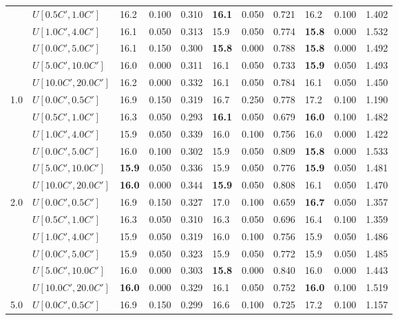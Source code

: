 \begin{table}[h]
{\begin{tabular}{|l|l||l|l|l||l|l|l||l|l|l|}
       & $U[0.5C',1.0C']$ & 16.2 & 0.100 & 0.310 & \textbf{16.1} & 0.050 & 0.721 & 16.2 & 0.100 & 1.402 \\
       & $U[1.0C',4.0C']$ & 16.1 & 0.050 & 0.313 & 15.9 & 0.050 & 0.774 & \textbf{15.8} & 0.000 & 1.532 \\
       & $U[0.0C',5.0C']$ & 16.1 & 0.150 & 0.300 & \textbf{15.8} & 0.000 & 0.788 & \textbf{15.8} & 0.000 & 1.492 \\
       & $U[5.0C',10.0C']$ & 16.0 & 0.000 & 0.311 & 16.1 & 0.050 & 0.733 & \textbf{15.9} & 0.050 & 1.493 \\
       & $U[10.0C',20.0C']$ & 16.2 & 0.000 & 0.332 & 16.1 & 0.050 & 0.784 & 16.1 & 0.050 & 1.450 \\
      \hline\hline
      \multirow{6}{*}{1.0} & $U[0.0C',0.5C']$ & 16.9 & 0.150 & 0.319 & 16.7 & 0.250 & 0.778 & 17.2 & 0.100 & 1.190 \\
       & $U[0.5C',1.0C']$ & 16.3 & 0.050 & 0.293 & \textbf{16.1} & 0.050 & 0.679 & \textbf{16.0} & 0.100 & 1.482 \\
       & $U[1.0C',4.0C']$ & 15.9 & 0.050 & 0.339 & 16.0 & 0.100 & 0.756 & 16.0 & 0.000 & 1.422 \\
       & $U[0.0C',5.0C']$ & 16.0 & 0.100 & 0.302 & 15.9 & 0.050 & 0.809 & \textbf{15.8} & 0.000 & 1.533 \\
       & $U[5.0C',10.0C']$ & \textbf{15.9} & 0.050 & 0.336 & 15.9 & 0.050 & 0.776 & \textbf{15.9} & 0.050 & 1.481 \\
       & $U[10.0C',20.0C']$ & \textbf{16.0} & 0.000 & 0.344 & \textbf{15.9} & 0.050 & 0.808 & 16.1 & 0.050 & 1.470 \\
      \hline\hline
      \multirow{6}{*}{2.0} & $U[0.0C',0.5C']$ & 16.9 & 0.150 & 0.327 & 17.0 & 0.100 & 0.659 & \textbf{16.7} & 0.050 & 1.357 \\
       & $U[0.5C',1.0C']$ & 16.3 & 0.050 & 0.310 & 16.3 & 0.050 & 0.696 & 16.4 & 0.100 & 1.359 \\
       & $U[1.0C',4.0C']$ & 15.9 & 0.050 & 0.319 & 16.0 & 0.100 & 0.756 & 15.9 & 0.050 & 1.486 \\
       & $U[0.0C',5.0C']$ & 15.9 & 0.050 & 0.323 & 15.9 & 0.050 & 0.772 & 15.9 & 0.050 & 1.485 \\
       & $U[5.0C',10.0C']$ & 16.0 & 0.000 & 0.303 & \textbf{15.8} & 0.000 & 0.840 & 16.0 & 0.000 & 1.443 \\
       & $U[10.0C',20.0C']$ & \textbf{16.0} & 0.000 & 0.329 & 16.1 & 0.050 & 0.752 & \textbf{16.0} & 0.100 & 1.519 \\
      \hline\hline
      \multirow{6}{*}{5.0} & $U[0.0C',0.5C']$ & 16.9 & 0.150 & 0.299 & 16.6 & 0.100 & 0.725 & 17.2 & 0.100 & 1.157 \\

\end{tabular}}
\end{table}
